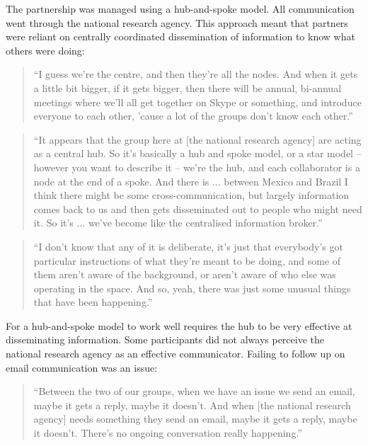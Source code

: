 The partnership was managed using a hub-and-spoke model. All communication went through the national research agency. This approach meant that partners were reliant on centrally coordinated dissemination of information to know what others were doing:

\begin{quote}
\small
\enquote{I guess we're the centre, and then they're all the nodes. And when it gets a little bit bigger, if it gets bigger, then there will be annual, bi-annual meetings where we'll all get together on Skype or something, and introduce everyone to each other, 'cause a lot of the groups don't know each other.} \\
\end{quote}

\begin{quote}
\small
\enquote{It appears that the group here at [the national research agency] are acting as a central hub.  So it’s basically a hub and spoke model, or a star model – however you want to describe it – we're the hub, and each collaborator is a node at the end of a spoke.  And there is ... between Mexico and Brazil I think there might be some cross-communication, but largely information comes back to us and then gets disseminated out to people who might need it.  So it's ... we've become like the centralised information broker.} \\
\end{quote}

\begin{quote}
\small
\enquote{I don't know that any of it is deliberate, it's just that everybody's got particular instructions of what they're meant to be doing, and some of them aren't aware of the background, or aren't aware of who else was operating in the space. And so, yeah, there was just some unusual things that have been happening.} \\
\end{quote}

For a hub-and-spoke model to work well requires the hub to be very effective at disseminating information. Some participants did not always perceive the national research agency as an effective communicator. Failing to follow up on email communication was an issue:

\begin{quote}
\small
\enquote{Between the two of our groups, when we have an issue we send an email, maybe it gets a reply, maybe it doesn't. And when [the national research agency] needs something they send an email, maybe it gets a reply, maybe it doesn't. There's  no ongoing conversation really happening.} \\
\end{quote}

